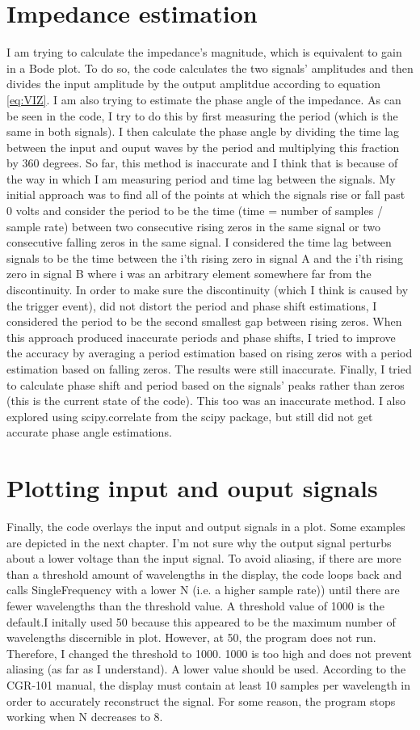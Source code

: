 	\section{Impedance estimation}
I am trying to calculate the impedance's magnitude, which is equivalent to gain in a Bode plot. To do so, the code calculates the two signals' amplitudes and then divides the input amplitude by the output amplitdue according to equation \ref{eq:VIZ}. I am also trying to estimate the phase angle of the impedance. As can be seen in the code, I try to do this by first measuring the period (which is the same in both signals). I then calculate the phase angle by dividing the time lag between the input and ouput waves by the period and multiplying this fraction by 360 degrees. So far, this method is inaccurate and I think that is because of the way in which I am measuring period and time lag between the signals. My initial approach was to find  all of the points at which the signals rise or fall past 0 volts and consider the period to be the time (time = number of samples / sample rate) between two consecutive rising zeros in the same signal or two consecutive falling zeros in the same signal. I considered the time lag between signals to be the time between the i'th rising zero in signal A and the i'th rising zero in signal B where i was an arbitrary element somewhere far from the discontinuity. In order to make sure the discontinuity (which I think is caused by the trigger event), did not distort the period and phase shift estimations, I considered the period to be the second smallest gap between rising zeros. When this approach produced inaccurate periods and phase shifts, I tried to improve the accuracy by averaging a period estimation based on rising zeros with a period estimation based on falling zeros. The results were still inaccurate. Finally, I  tried to calculate phase shift and period based on the signals' peaks rather than zeros (this is the current state of the code). This too was an inaccurate method. I also explored using scipy.correlate from the scipy package, but still did not get accurate phase angle estimations.
\section{Plotting input and ouput signals}
Finally, the code overlays the input and output signals in a plot. Some examples are depicted in the next chapter. I'm not sure why the output signal perturbs about a lower voltage than the input signal. To avoid aliasing, if there are more than a threshold amount of wavelengths in the display, the code loops back and calls SingleFrequency with a lower N (i.e. a higher sample rate)) until there are fewer wavelengths than the threshold value. A threshold value of 1000 is the default.I initally used 50 because this appeared to be the maximum number of wavelengths discernible in plot. However, at 50, the program does not run. Therefore, I changed the threshold to 1000. 1000 is too high and does not prevent aliasing (as far as I understand). A lower value should be used. According to the CGR-101 manual, the display must contain at least 10 samples per wavelength in order to accurately reconstruct the signal. For some reason, the program stops working when N decreases to 8.

